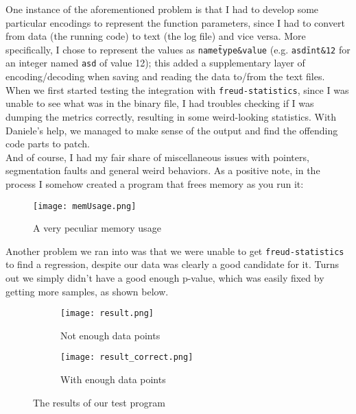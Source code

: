        One instance of the aforementioned problem is that I had to develop some particular encodings
        to represent the function parameters, since I had to convert from data (the running code) to text
        (the log file) and vice versa. More specifically, I chose to represent the values as 
        \texttt{name\=type\&value} (e.g. \texttt{asd\=int\&12} for an integer named \texttt{asd} of value 12);
        this added a supplementary layer of encoding/decoding when saving and reading the data to/from the
        text files.\\

        When we first started testing the integration with \texttt{freud-statistics}, since I was unable
        to see what was in the binary file, I had troubles checking if I was dumping the metrics correctly,
        resulting in some weird-looking statistics. With Daniele's help, we managed to make sense of
        the output and find the offending code parts to patch.\\

        And of course, I had my fair share of miscellaneous issues with pointers, segmentation faults and 
        general weird behaviors. As a positive note, in the process I somehow created a program that frees
        memory as you run it:

        \begin{figure}[H]
            \centering
            \texttt{[image: memUsage.png]}
            \caption{A very peculiar memory usage}
            \label{fig:memUsage}
        \end{figure}

        Another problem we ran into was that we were unable to get \texttt{freud-statistics} to find a
        regression, despite our data was clearly a good candidate for it. Turns out we simply didn't have a
        good enough p-value, which was easily fixed by getting more samples, as shown below.

        \begin{figure}[H]
            \centering
            \begin{subfigure}[b]{0.49\textwidth}
                \texttt{[image: result.png]}
                \caption{Not enough data points}
                \label{fig:result1}
            \end{subfigure}
            \hfill
            \begin{subfigure}[b]{0.49\textwidth}
                \texttt{[image: result\_correct.png]}
                \caption{With enough data points}
                \label{fig:result2}
            \end{subfigure}
            \caption{The results of our test program}
            \label{fig:fullresult}
        \end{figure}



